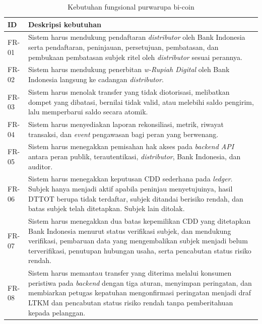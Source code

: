 \begin{table}[H]
    \caption{Kebutuhan fungsional purwarupa bi-coin}
    \label{tab:srs-fungsional}
    \centering
    \small
    \begin{tabular}{@{}p{1.5cm}p{9.8cm}@{}}
        \toprule
        \textbf{ID} & \textbf{Deskripsi kebutuhan} \\
        \midrule
        FR-01 & Sistem harus mendukung pendaftaran \textit{distributor} oleh Bank Indonesia serta pendaftaran, peninjauan, persetujuan, pembatasan, dan pembukaan pembatasan subjek ritel oleh \textit{distributor} sesuai perannya. \\
        FR-02 & Sistem harus mendukung penerbitan \textit{w-Rupiah Digital} oleh Bank Indonesia langsung ke cadangan \textit{distributor}. \\
        FR-03 & Sistem harus menolak transfer yang tidak diotorisasi, melibatkan dompet yang dibatasi, bernilai tidak valid, atau melebihi saldo pengirim, lalu memperbarui saldo secara atomik. \\
        FR-04 & Sistem harus menyediakan laporan rekonsiliasi, metrik, riwayat transaksi, dan \textit{event} pengawasan bagi peran yang berwenang. \\
        FR-05 & Sistem harus menegakkan pemisahan hak akses pada \textit{backend API} antara peran publik, terautentikasi, \textit{distributor}, Bank Indonesia, dan auditor. \\
        FR-06 & Sistem harus menegakkan keputusan CDD sederhana pada \textit{ledger}. Subjek hanya menjadi aktif apabila peninjau menyetujuinya, hasil DTTOT berupa tidak terdaftar, subjek ditandai berisiko rendah, dan batas subjek telah ditetapkan. Subjek lain ditolak. \\
        FR-07 & Sistem harus menegakkan dua batas kepemilikan CDD yang ditetapkan Bank Indonesia menurut status verifikasi subjek, dan mendukung verifikasi, pembaruan data yang mengembalikan subjek menjadi belum terverifikasi, penutupan hubungan usaha, serta pencabutan status risiko rendah. \\
        FR-08 & Sistem harus memantau transfer yang diterima melalui konsumen peristiwa pada \textit{backend} dengan tiga aturan, menyimpan peringatan, dan membiarkan petugas kepatuhan mengonfirmasi peringatan menjadi draf LTKM dan pencabutan status risiko rendah tanpa pemberitahuan kepada pelanggan. \\
        \bottomrule
    \end{tabular}
\end{table}

